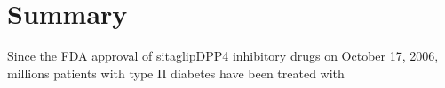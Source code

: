 \section{\label{chap:Sum} Summary}
Since the FDA approval of sitaglipDPP4 inhibitory drugs on October 17, 2006, millions patients with type II diabetes have been treated with 
